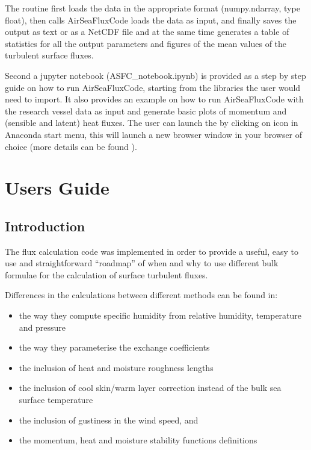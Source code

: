 \documentclass[letterpaper,10pt,english]{sphinxmanual}
\begin{document}
\sphinxAtStartPar
The routine first loads the data in the appropriate format (numpy.ndarray, type float), then calls AirSeaFluxCode loads the data as input, and finally saves the output as  text or as a NetCDF file and at the same time generates a table of statistics for all the output parameters and figures of the mean values of the turbulent surface fluxes.

\sphinxAtStartPar
Second a jupyter notebook (ASFC\_notebook.ipynb) is provided as a step by step guide on how to run AirSeaFluxCode, starting from the libraries the user would need to import. It also provides an example on how to run AirSeaFluxCode with the research vessel data as input and generate basic plots of momentum and (sensible and latent) heat fluxes. The user can launch the  by clicking on  icon in Anaconda start menu, this will launch a new browser window in your browser of choice (more details can be found ).

\sphinxstepscope


\chapter{Users Guide}
\label{\detokenize{users_guide:users-guide}}\label{\detokenize{users_guide::doc}}

\section{Introduction}
\label{\detokenize{users_guide:introduction}}
\sphinxAtStartPar
The flux calculation code was implemented in order to provide a useful, easy to use and straightforward “roadmap” of when and why to use different bulk formulae for the calculation of surface turbulent fluxes.

\sphinxAtStartPar
Differences in the calculations between different methods can be found in:
\begin{itemize}
\item {} 
\sphinxAtStartPar
the way they compute specific humidity from relative humidity, temperature and pressure

\item {} 
\sphinxAtStartPar
the way they parameterise the exchange coefficients

\item {} 
\sphinxAtStartPar
the inclusion of heat and moisture roughness lengths

\item {} 
\sphinxAtStartPar
the inclusion of cool skin/warm layer correction instead of the bulk sea surface temperature

\item {} 
\sphinxAtStartPar
the inclusion of gustiness in the wind speed, and

\item {} 
\sphinxAtStartPar
the momentum, heat and moisture stability functions definitions

\end{itemize}
\end{document}
